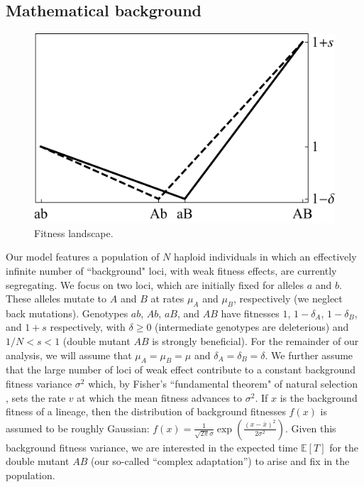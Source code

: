 \documentclass[rmp]{revtex4}
\begin{document}
\begin{spacing}{1.5}
\section*{Mathematical background}

\begin{figure}
\begin{center}
  \includegraphics[scale=0.75]{Figures/valley.pdf}
  \caption{Fitness landscape.}
  \label{fig:landscape}
\end{center}
\end{figure}

Our model features a population of $N$ haploid individuals in which an effectively infinite number of ``background" loci, with weak fitness effects, are currently segregating.
We focus on two loci, which are initially fixed for alleles $a$ and $b$.
These alleles mutate to $A$ and $B$ at rates $\mu_A$ and $\mu_B$, respectively (we neglect back mutations).
Genotypes $ab$, $Ab$, $aB$, and $AB$ have fitnesses $1$, $1-\delta_A$, $1-\delta_B$, and $1+s$ respectively, with $\delta \geq 0$ (intermediate genotypes are deleterious) and $1/N < s < 1$ (double mutant $AB$ is strongly beneficial).
For the remainder of our analysis, we will assume that $\mu_A = \mu_B = \mu$ and $\delta_A = \delta_B = \delta$.
We further assume that the large number of loci of weak effect contribute to a constant background fitness variance $\sigma^2$ which, by Fisher's ``fundamental theorem" of natural selection \citep{Fisher:1930}, sets the rate $v$ at which the mean fitness advances to $\sigma^{2}$.
If $x$ is the background fitness of a lineage, then the distribution of background fitnesses $f(x)$ is assumed to be roughly Gaussian: $f(x) = \frac{1}{\sqrt{2\pi}\sigma} \exp (\frac{(x-\bar{x})^2}{2\sigma^2})$.
Given this background fitness variance, we are interested in the expected time $\mathbb{E}\left[ T\right]$ for the double mutant $AB$ (our so-called ``complex adaptation'') to arise and fix in the population.


\end{spacing}
\end{document}
